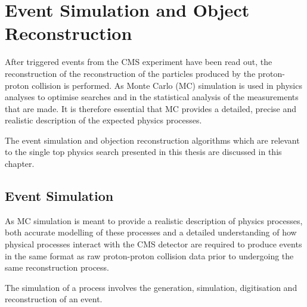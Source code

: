 \chapter{Event Simulation and Object Reconstruction}\label{chapter:data-mc}
After triggered events from the CMS experiment have been read out, the reconstruction of the reconstruction of the particles produced by the proton-proton collision is performed.
As Monte Carlo (MC) simulation is used in physics analyses to optimise searches and in the statistical analysis of the measurements that are made.
It is therefore essential that MC provides a detailed, precise and realistic description of the expected physics processes.
 
The event simulation and objection reconstruction algorithms which are relevant to the single top physics search presented in this thesis are discussed in this chapter.

\section{Event Simulation}\label{sec:sim}
As MC simulation is meant to provide a realistic description of physics processes, both accurate modelling of these processes and a detailed understanding of how physical processes interact with the CMS detector are required to produce events in the same format as raw proton-proton collision data prior to undergoing the same reconstruction process.


%
%


%

The simulation of a process involves the generation, simulation, digitisation and reconstruction of an event.


